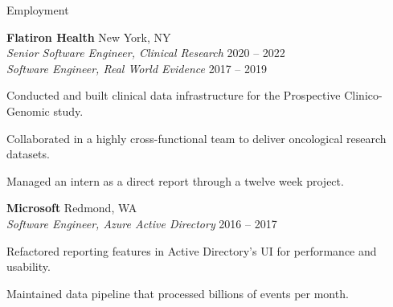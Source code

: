 \documentclass{resume} %
\begin{document}

\begin{grouping}{Employment}

    \iffalse
    \item {\bf Brown University } \hfill Providence, RI \\
        {\em Research Assistant} \hfill 2023
        \begin{items}
            \item Worked with Peihan Miao on three research projects.
        \end{items}
    \fi

    \item {\bf Flatiron Health } \hfill New York, NY \\
        {\em Senior Software Engineer, Clinical Research } \hfill 2020 -- 2022 \\
        {\em Software Engineer, Real World Evidence } \hfill 2017 -- 2019
        \begin{items}
            \item Conducted and built clinical data infrastructure for the Prospective Clinico-Genomic study.
            \item Collaborated in a highly cross-functional team to deliver oncological research datasets.
            \item Managed an intern as a direct report through a twelve week project.
        \end{items}

    \iffalse
    \item Conducted Prospective Clinico-Genomic (PCG) study with cross-functional team
    \item Developed system for sending data quality inquiries to study practices
    \item Managed an intern as a direct report through a 12 week project
    \fi

    \iffalse
    \item Collaborated in a highly cross-functional team to deliver 11 projects
    \item Built data pipelines to create oncological research datasets
    \item Designed and implemented tools to automate team processes
    \fi

    \item {\bf Microsoft } \hfill Redmond, WA \\
        {\em Software Engineer, Azure Active Directory} \hfill 2016 -- 2017
        \begin{items}
            \item Refactored reporting features in Active Directory’s UI for performance and usability.
            \item Maintained data pipeline that processed billions of events per month.
        \end{items}


\end{grouping}
\end{document}
